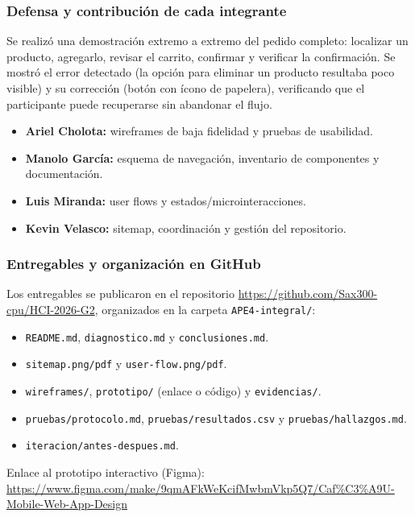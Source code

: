 \documentclass{article}
\begin{document}
\subsubsection{Defensa y contribución de cada integrante}
Se realizó una demostración extremo a extremo del pedido completo: localizar un producto, agregarlo, revisar el carrito, confirmar y verificar la confirmación. Se mostró el error detectado (la opción para eliminar un producto resultaba poco visible) y su corrección (botón con ícono de papelera), verificando que el participante puede recuperarse sin abandonar el flujo.

\begin{itemize}[leftmargin=1.5em, itemsep=3pt]
    \item \textbf{Ariel Cholota:} wireframes de baja fidelidad y pruebas de usabilidad.
    \item \textbf{Manolo García:} esquema de navegación, inventario de componentes y documentación.
    \item \textbf{Luis Miranda:} user flows y estados/microinteracciones.
    \item \textbf{Kevin Velasco:} sitemap, coordinación y gestión del repositorio.
\end{itemize}

\subsubsection{Entregables y organización en GitHub}
Los entregables se publicaron en el repositorio \url{https://github.com/Sax300-cpu/HCI-2026-G2}, organizados en la carpeta \texttt{APE4-integral/}:
\begin{itemize}[leftmargin=1.5em, itemsep=3pt]
    \item \texttt{README.md}, \texttt{diagnostico.md} y \texttt{conclusiones.md}.
    \item \texttt{sitemap.png/pdf} y \texttt{user-flow.png/pdf}.
    \item \texttt{wireframes/}, \texttt{prototipo/} (enlace o código) y \texttt{evidencias/}.
    \item \texttt{pruebas/protocolo.md}, \texttt{pruebas/resultados.csv} y \texttt{pruebas/hallazgos.md}.
    \item \texttt{iteracion/antes-despues.md}.
\end{itemize}
Enlace al prototipo interactivo (Figma): \url{https://www.figma.com/make/9qmAFkWeKcifMwbmVkp5Q7/Caf%C3%A9U-Mobile-Web-App-Design}
\end{document}
